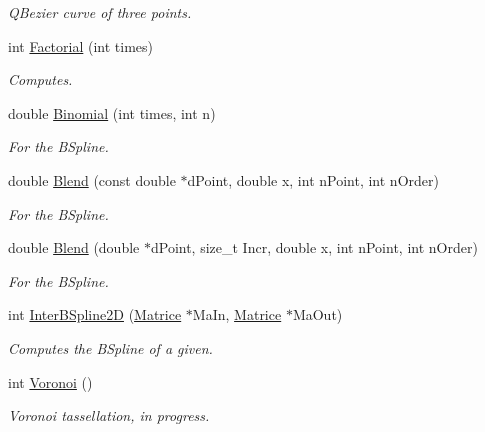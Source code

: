 \begin{DoxyCompactItemize}
\begin{DoxyCompactList}\small\item\em \-Q\-Bezier curve of three points. \end{DoxyCompactList}\item 
int \hyperlink{classMatematica_ad2b38169a207719ef452a9c7f5bd7dc1}{\-Factorial} (int times)
\begin{DoxyCompactList}\small\item\em \-Computes. \end{DoxyCompactList}\item 
\hypertarget{classMatematica_a4824376b80f3c23bd55989b1a6f80ffc}{double \hyperlink{classMatematica_a4824376b80f3c23bd55989b1a6f80ffc}{\-Binomial} (int times, int n)}\label{classMatematica_a4824376b80f3c23bd55989b1a6f80ffc}

\begin{DoxyCompactList}\small\item\em \-For the \-B\-Spline. \end{DoxyCompactList}\item 
\hypertarget{classMatematica_a9dbb46c7af9cbcd87568e0dace30d10e}{double \hyperlink{classMatematica_a9dbb46c7af9cbcd87568e0dace30d10e}{\-Blend} (const double $\ast$d\-Point, double x, int n\-Point, int n\-Order)}\label{classMatematica_a9dbb46c7af9cbcd87568e0dace30d10e}

\begin{DoxyCompactList}\small\item\em \-For the \-B\-Spline. \end{DoxyCompactList}\item 
\hypertarget{classMatematica_a078a6c2222921c85f87f62b4d61b4553}{double \hyperlink{classMatematica_a078a6c2222921c85f87f62b4d61b4553}{\-Blend} (double $\ast$d\-Point, size\-\_\-t \-Incr, double x, int n\-Point, int n\-Order)}\label{classMatematica_a078a6c2222921c85f87f62b4d61b4553}

\begin{DoxyCompactList}\small\item\em \-For the \-B\-Spline. \end{DoxyCompactList}\item 
int \hyperlink{classMatematica_a9566503fbc9720a56e0439302fcc10ce}{\-Inter\-B\-Spline2\-D} (\hyperlink{classMatrice}{\-Matrice} $\ast$\-Ma\-In, \hyperlink{classMatrice}{\-Matrice} $\ast$\-Ma\-Out)
\begin{DoxyCompactList}\small\item\em \-Computes the \-B\-Spline of a given. \end{DoxyCompactList}\item 
\hypertarget{classMatematica_a74028c96f1da61fd4bb0b0df6c720bc0}{int \hyperlink{classMatematica_a74028c96f1da61fd4bb0b0df6c720bc0}{\-Voronoi} ()}\label{classMatematica_a74028c96f1da61fd4bb0b0df6c720bc0}

\begin{DoxyCompactList}\small\item\em \-Voronoi tassellation, in progress. \end{DoxyCompactList}\end{DoxyCompactItemize}
